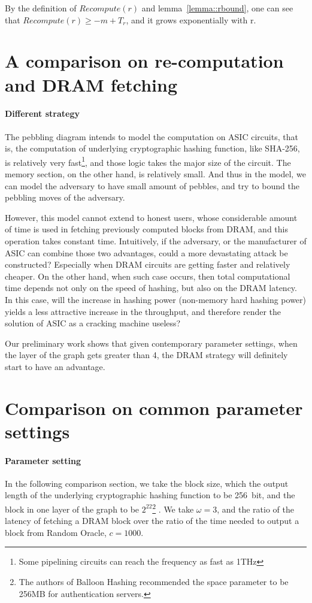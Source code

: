 \documentclass[a4paper, oneside]{article}
\begin{document}
By the definition of $Recompute(r)$ and lemma~\ref{lemma::rbound}, one can see that $Recompute(r) \geq -m + T_r$, and it grows exponentially with r.

\section{A comparison on re-computation and DRAM fetching}
\paragraph{Different strategy}
The pebbling diagram intends to model the computation on ASIC circuits, that is, the computation of underlying cryptographic hashing function,
like SHA-256, is relatively very fast\footnote{Some pipelining circuits can reach the frequency as fast as 1THz %
}, and those logic takes the major size of the circuit. The memory section, on the other hand, is relatively small. And thus in the model, we can
model the adversary to have small amount of pebbles, and try to bound the pebbling moves of the adversary.

However, this model cannot extend to honest users, whose considerable amount of time is used in fetching previously computed blocks from DRAM, and this
operation takes constant time. Intuitively, if the adversary, or the manufacturer of ASIC can combine those two advantages, could a more devastating attack
be constructed? Especially when DRAM circuits are getting faster and relatively cheaper. On the other hand, when such case occurs, then total computational
time depends not only on the speed of hashing, but also on the DRAM latency. In this case, will the increase in hashing power (non-memory hard hashing power)
yields a less attractive increase in the throughput, and therefore render the solution of ASIC as a cracking machine useless?

Our preliminary work shows that given contemporary parameter settings, when the layer of the graph gets greater than 4, the DRAM strategy will definitely
start to have an advantage.

\section{Comparison on common parameter settings}
\paragraph{Parameter setting}
In the following comparison section, we take the block size, which the output length of the underlying cryptographic hashing function to be 256~bit,
and the block in one layer of the graph to be $2^22$\footnote{The authors of Balloon Hashing recommended the space parameter to be 256MB for authentication servers.}
. We take $\omega = 3$, and the ratio of the latency of fetching a DRAM block over the ratio of
the time needed to output a block from Random Oracle, $c = 1000$.
\end{document}
